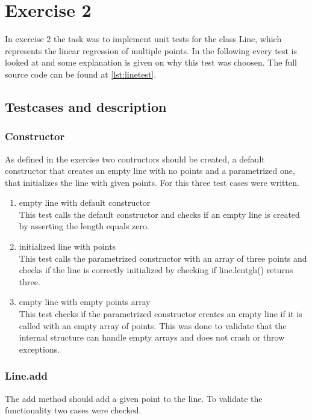 \chapter{Exercise 2}
In exercise 2 the task was to implement unit tests for the class Line, which represents the linear regression of multiple points. In the following every test is looked at and some explanation is given on why this test was choosen. The full source code can be found at \ref{lst:linetest}.

\section{Testcases and description}

\subsection{Constructor}
As defined in the exercise two contructors should be created, a default constructor that creates an empty line with no points and a parametrized one, that initializes the line with given points. For this three test cases were written.

\begin{enumerate}
    \item empty line with default constructor \\
    This test calls the default constructor and checks if an empty line is created by asserting the length equals zero.
    \item initialized line with points \\
    This test calls the parametrized constructor with an array of three points and checks if the line is correctly initialized by checking if line.lentgh() returns three.
    \item empty line with empty points array \\
    This test checks if the parametrized constructor creates an empty line if it is called with an empty array of points. This was done to validate that the internal structure can handle empty arrays and does not crash or throw exceptions.
\end{enumerate}

\subsection{Line.add}
The add method should add a given point to the line. To validate the functionality two cases were checked.

